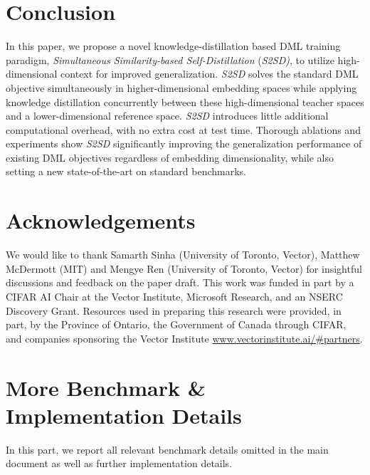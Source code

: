 \documentclass{article} \usepackage{arxiv_style,times}
\begin{document}
 \section{Conclusion}
In this paper, we propose a novel knowledge-distillation based DML training paradigm, \textit{Simultaneous Similarity-based Self-Distillation} (\textit{S2SD)}, to utilize high-dimensional context for improved generalization. 
\textit{S2SD} solves the standard DML objective simultaneously in higher-dimensional embedding spaces while applying knowledge distillation concurrently between these high-dimensional teacher spaces and a lower-dimensional reference space. \textit{S2SD} introduces little additional computational overhead, with no extra cost at test time. Thorough ablations and experiments show \textit{S2SD} significantly improving the generalization performance of existing DML objectives regardless of embedding dimensionality, while also setting a new state-of-the-art on standard benchmarks.

\newpage
\section*{Acknowledgements}
We would like to thank Samarth Sinha (University of Toronto, Vector), Matthew McDermott (MIT) and Mengye Ren (University of Toronto, Vector) for insightful discussions and feedback on the paper draft. This work was funded in part by a CIFAR AI Chair at the Vector Institute, Microsoft Research, and an NSERC Discovery Grant. Resources used in preparing this research were provided, in part, by the Province of Ontario, the Government of Canada through CIFAR, and companies sponsoring the Vector Institute \url{www.vectorinstitute.ai/#partners}.




\newpage
\appendix
\onecolumn
{}

\section{More Benchmark \& Implementation Details}\label{supp:bench_dets}
In this part, we report all relevant benchmark details omitted in the main document as well as further implementation details.\\
\end{document}
